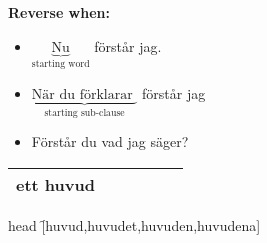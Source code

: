 
\begin{flushleft}
    \textbf{Reverse when:}
    \begin{itemize}
        \item $\underbrace{\text{Nu}}_{\text{starting word}}$ förstår jag.
        \item $\underbrace{\text{När du förklarar }}_{\text{starting sub-clause}}$ förstår jag
        \item Förstår du vad jag säger?
    \end{itemize}
\end{flushleft}

\begin{center}
    \begin{tabular}{|c c c c c c|}
        \hline
        ett huvud &  &  &  &  &  \\
        \hline
    \end{tabular}
\end{center}

\begin{questions}
    \begin{multicols}{2}
        \raggedcolumns
        \question head \f[huvud,huvudet,huvuden,huvudena]
    \end{multicols}
\end{questions}
